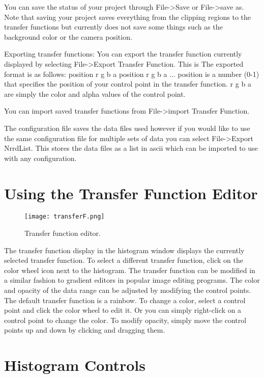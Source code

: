 You can save the status of your project through File->Save or File->save as. Note that saving your project saves everything from the clipping regions to the transfer functions but currently does not save some things such as the background color or the camera position.

Exporting transfer functions: You can export the transfer function currently displayed by selecting File->Export Transfer Function. This is The exported format is as follows: position r g b a position r g b a ... position is a number (0-1) that specifies the position of your control point in the transfer function. r g b a are simply the color and alpha values of the control point.

You can import saved transfer functions from File->import Transfer Function. 

The configuration file saves the data files used however if you would like to use the same configuration file for multiple sets of data you can select File->Export NrrdList.  This stores the data files as a list in ascii which can be imported to use with any configuration.  

\section{Using the Transfer Function Editor}

\begin{figure}[htbp]
  \center
  \texttt{[image: transferF.png]}
  \caption{Transfer function editor.}
  \label{fig:manta_tf}
\end{figure}

The transfer function display in the histogram window displays the currently selected transfer function. To select a different transfer function, click on the color wheel icon next to the histogram. The transfer function can be modified in a similar fashion to gradient editors in popular image editing programs. The color and opacity of the data range can be adjusted by modifying the control points. The default transfer function is a rainbow. To change a color, select a control point and click the color wheel to edit it. Or you can simply right-click on a control point to change the color. To modify opacity, simply move the control points up and down by clicking and dragging them.

\section{Histogram Controls}

